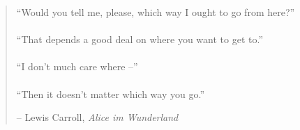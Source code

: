 
\newpage \vspace*{4cm}
\thispagestyle{empty}
\begin{quotation}
\begin{center}
  \large
  \enquote{Would you tell me, please, which way I ought to go from here?} \\~\\
  \enquote{That depends a good deal on where you want to get to.} \\~\\
  \enquote{I don't much care where --} \\~\\
  \enquote{Then it doesn't matter which way you go.}
\end{center}
\begin{flushright} -- Lewis Carroll, \textit{Alice im Wunderland}\end{flushright}
\end{quotation}
